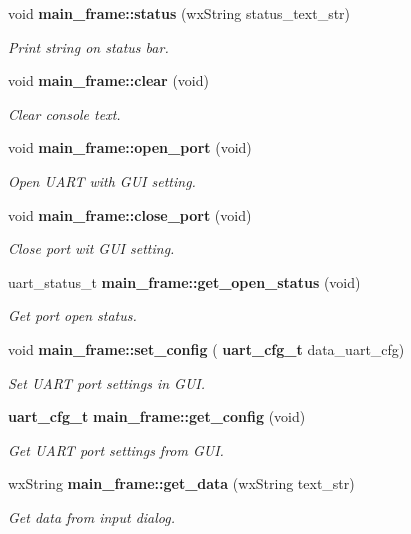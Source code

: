 \begin{DoxyCompactItemize}
void \textbf{ main\+\_\+frame\+::status} (wx\+String status\+\_\+text\+\_\+str)
\begin{DoxyCompactList}\small\item\em Print string on status bar. \end{DoxyCompactList}\item 
void \textbf{ main\+\_\+frame\+::clear} (void)
\begin{DoxyCompactList}\small\item\em Clear console text. \end{DoxyCompactList}\item 
void \textbf{ main\+\_\+frame\+::open\+\_\+port} (void)
\begin{DoxyCompactList}\small\item\em Open U\+A\+RT with G\+UI setting. \end{DoxyCompactList}\item 
void \textbf{ main\+\_\+frame\+::close\+\_\+port} (void)
\begin{DoxyCompactList}\small\item\em Close port wit G\+UI setting. \end{DoxyCompactList}\item 
uart\+\_\+status\+\_\+t \textbf{ main\+\_\+frame\+::get\+\_\+open\+\_\+status} (void)
\begin{DoxyCompactList}\small\item\em Get port open status. \end{DoxyCompactList}\item 
void \textbf{ main\+\_\+frame\+::set\+\_\+config} (\textbf{ uart\+\_\+cfg\+\_\+t} data\+\_\+uart\+\_\+cfg)
\begin{DoxyCompactList}\small\item\em Set U\+A\+RT port settings in G\+UI. \end{DoxyCompactList}\item 
\textbf{ uart\+\_\+cfg\+\_\+t} \textbf{ main\+\_\+frame\+::get\+\_\+config} (void)
\begin{DoxyCompactList}\small\item\em Get U\+A\+RT port settings from G\+UI. \end{DoxyCompactList}\item 
wx\+String \textbf{ main\+\_\+frame\+::get\+\_\+data} (wx\+String text\+\_\+str)
\begin{DoxyCompactList}\small\item\em Get data from input dialog. \end{DoxyCompactList}\item 

\end{DoxyCompactItemize}
